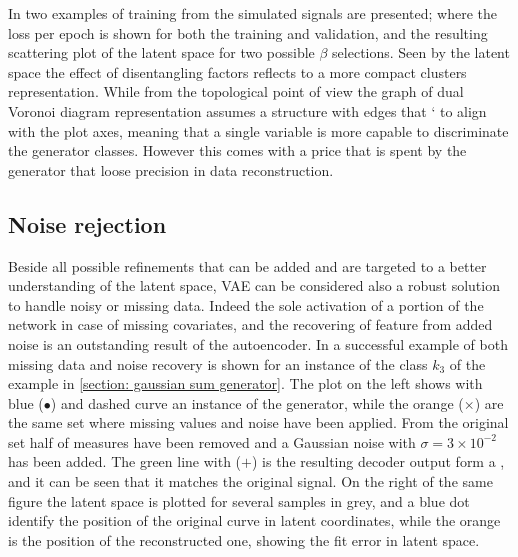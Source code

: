 In \Figure{\ref{fig:step1_ls_regularization}} two examples of training from the simulated signals are presented; where the loss per epoch is shown for both the training and validation, and the resulting scattering plot of the latent space for two possible $\beta$ selections.
Seen by the latent space the effect of disentangling factors reflects to a more compact clusters representation. While from the topological point of view the graph of dual Voronoi diagram representation assumes a structure with edges that ` to align with the plot axes, meaning that a single variable is more capable to discriminate the generator classes.
However this comes with a price that is spent by the generator that loose precision in data reconstruction.

\subsection{Noise rejection}
Beside all possible refinements that can be added and are targeted to a better understanding of the latent space, \acs{VAE} can be considered also a robust solution to handle noisy or missing data. Indeed the sole activation of a portion of the network in case of missing covariates, and the recovering of feature from added noise is an outstanding result of the autoencoder. In \Figure{\ref{fig:step1_noise_rejection}} a successful example of both missing data and noise recovery is shown for an instance of the class $k_3$ of the example in \cref{section: gaussian sum generator}. The plot on the left shows with blue ($\bullet$) and dashed curve an instance of the generator, while the orange ($\times$) are the same set where missing values and noise have been applied. From the original set half of measures have been removed and a Gaussian noise with $\sigma=3\times10^{-2}$ has been added. The green line with ($+$) is the resulting decoder output form a , and it can be seen that it matches the original signal. On the right of the same figure the latent space is plotted for several samples in grey, and a blue dot identify the position of the original curve in latent coordinates, while the orange is the position of the reconstructed one, showing the fit error in latent space.
